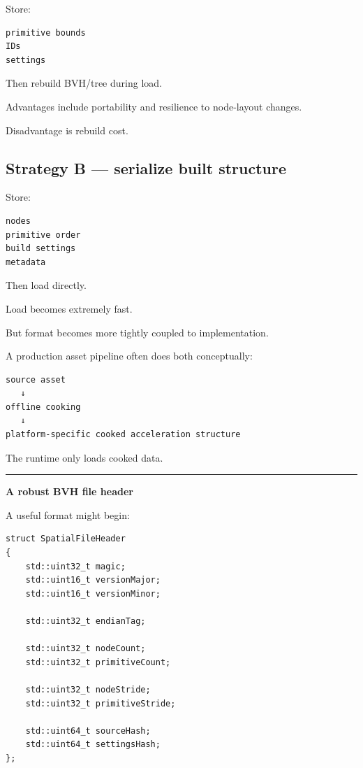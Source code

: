 Store:

\begin{verbatim}
primitive bounds
IDs
settings
\end{verbatim}

Then rebuild BVH/tree during load.

Advantages include portability and resilience to node-layout changes.

Disadvantage is rebuild cost.

\subsection{Strategy B --- serialize built structure}\label{06-engine-ii-ch031-strategy-b-serialize-built-structure}

Store:

\begin{verbatim}
nodes
primitive order
build settings
metadata
\end{verbatim}

Then load directly.

Load becomes extremely fast.

But format becomes more tightly coupled to implementation.

A production asset pipeline often does both conceptually:

\begin{verbatim}
source asset
   ↓
offline cooking
   ↓
platform-specific cooked acceleration structure
\end{verbatim}

The runtime only loads cooked data.

\begin{center}\rule{0.5\linewidth}{0.5pt}\end{center}

\textbf{A robust BVH file header}

A useful format might begin:

\begin{verbatim}
struct SpatialFileHeader
{
    std::uint32_t magic;
    std::uint16_t versionMajor;
    std::uint16_t versionMinor;

    std::uint32_t endianTag;

    std::uint32_t nodeCount;
    std::uint32_t primitiveCount;

    std::uint32_t nodeStride;
    std::uint32_t primitiveStride;

    std::uint64_t sourceHash;
    std::uint64_t settingsHash;
};
\end{verbatim}

